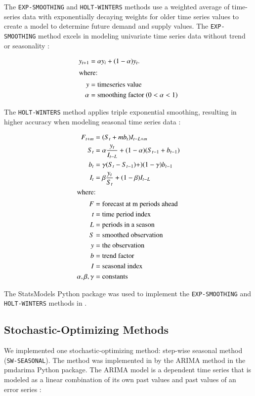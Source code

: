 The \texttt{EXP-SMOOTHING} and \texttt{HOLT-WINTERS} 
methods use a weighted average 
of time-series data with exponentially decaying weights 
for older time series values \cite{hyndman_forecasting:_2018}
to create a model to determine future demand and supply values. 
The \texttt{EXP-SMOOTHING} method excels in 
modeling univariate time series data without trend or seasonality
\cite{hyndman_forecasting:_2018}: 

\begin{align}
    \label{eq:expsm}
    y_{t+1} &= \alpha y_i + (1-\alpha)y_t. \\ 
    \intertext{where:}
    y &= \mbox{timeseries value} \nonumber \\
    \alpha &= \mbox{smoothing factor } (0 < \alpha < 1) \nonumber
\end{align}

\noindent
The \texttt{HOLT-WINTERS} method applies triple exponential 
smoothing, resulting in higher accuracy when 
modeling seasonal time series data 
\cite{sematech_engineering_2006}: 

\begin{align}
    F_{t+m} &= (S_t +mb_t)I_{t-L+m} \\
    S_t &= \alpha \frac{y_t}{I_{t-L}}+(1-\alpha)(S_{t-1}+b_{t-1}) \nonumber \\
    b_t &= \gamma(S_t-S_{t-1})+)(1-\gamma)b_{t-1} \nonumber \\
    I_t &= \beta \frac{y_t}{S_t} + (1-\beta)I_{t-L} \nonumber \\
    \intertext{where:}
    F &= \mbox{forecast at m periods ahead} \nonumber \\
    t &= \mbox{time period index} \nonumber \\
    L &= \mbox{periods in a season} \nonumber \\
    S &= \mbox{smoothed observation} \nonumber \\
    y &= \mbox{the observation} \nonumber \\
    b &= \mbox{trend factor} \nonumber \\
    I &= \mbox{seasonal index} \nonumber \\
    \alpha, \beta, \gamma &= \mbox{constants} \nonumber
\end{align}

\noindent
The StatsModels \cite{seabold_statsmodels:_2010}
Python package was used to implement the \texttt{EXP-SMOOTHING} 
and \texttt{HOLT-WINTERS} methods in \deploy. 

\subsection{Stochastic-Optimizing Methods}
We implemented one stochastic-optimizing method: step-wise 
seasonal method (\texttt{SW-SEASONAL}).
The method was implemented in \deploy by the \gls{ARIMA} 
method in the pmdarima \cite{smith_pmdarima:_2017}
Python package. 
The \gls{ARIMA} model is a dependent time series that is 
modeled as a linear combination of its own past values 
and past values of an error series \cite{institute_sas_1985}: 

